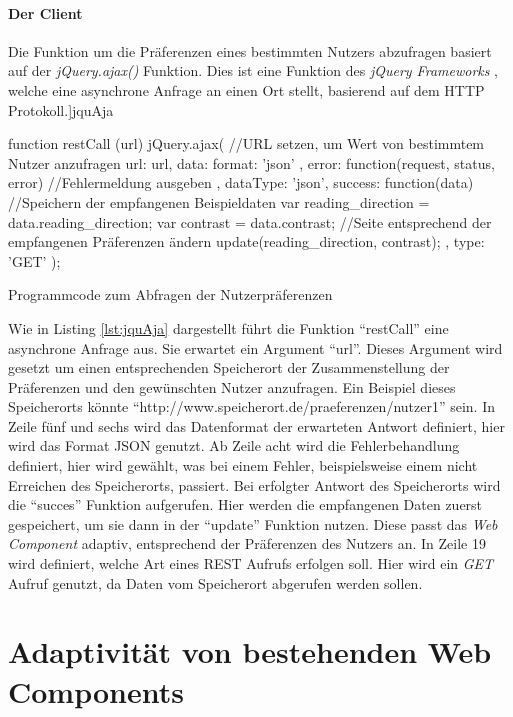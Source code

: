 \documentclass[12pt, paper=a4, bibtotoc, toc=listof, headsepline=true]{scrreprt}
\renewcommand{\smfootcite}[2][2]{\relax}
\begin{document}
		\subsubsection{Der Client}
		Die Funktion um die Präferenzen eines bestimmten Nutzers abzufragen basiert auf der \emph{jQuery.ajax()} Funktion. Dies ist eine Funktion des \emph{jQuery Frameworks} , welche eine asynchrone Anfrage an einen Ort stellt, basierend auf dem \ac{HTTP} Protokoll.\smfootcite[ vgl.][]{jquAja}
		\begin{listing}
			\begin{JavaScriptcode*}{}
function restCall (url){
   jQuery.ajax({
      //URL setzen, um Wert von bestimmtem Nutzer anzufragen
      url: url,
      data: {
         format: 'json'
      },
      error: function(request, status, error) {
         //Fehlermeldung ausgeben
      },
      dataType: 'json',
      success: function(data) {
         //Speichern der empfangenen Beispieldaten
         var reading_direction = data.reading_direction;
         var contrast = data.contrast;
         //Seite entsprechend der empfangenen Präferenzen ändern
         update(reading_direction, contrast);
      },
      type: 'GET'
   });
}
			\end{JavaScriptcode*}
			\caption{Programmcode zum Abfragen der Nutzerpräferenzen}
			\label{lst:jquAja}
		\end{listing}
		Wie in Listing \ref{lst:jquAja} dargestellt führt die Funktion \enquote{restCall} eine asynchrone Anfrage aus. Sie erwartet ein Argument \enquote{url}. Dieses Argument wird gesetzt um einen entsprechenden Speicherort der Zusammenstellung der Präferenzen und den gewünschten Nutzer anzufragen. Ein Beispiel dieses Speicherorts könnte \enquote{http://www.speicherort.de/praeferenzen/nutzer1} sein. In Zeile fünf und sechs wird das Datenformat der erwarteten Antwort definiert, hier wird das Format \ac{JSON} genutzt. Ab Zeile acht wird die Fehlerbehandlung definiert, hier wird gewählt, was bei einem Fehler, beispielsweise einem nicht Erreichen des Speicherorts, passiert. Bei erfolgter Antwort des Speicherorts wird die \enquote{succes} Funktion aufgerufen. Hier werden die empfangenen Daten zuerst gespeichert, um sie dann in der \enquote{update} Funktion nutzen. Diese passt das \emph{Web Component} adaptiv, entsprechend der Präferenzen des Nutzers an.  In Zeile 19 wird definiert, welche Art eines \ac{REST} Aufrufs erfolgen soll. Hier wird ein \emph{GET} Aufruf genutzt, da Daten vom Speicherort abgerufen werden sollen.
\chapter{Adaptivität von bestehenden Web Components}
\end{document}
